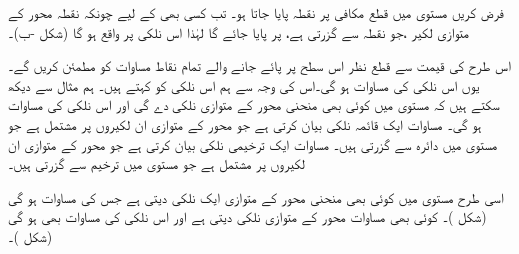 فرض کریں مستوی  میں  قطع مکافی  پر نقطہ  پایا جاتا ہو۔ تب کسی بھی  کے لیے  چونکہ نقطہ  محور  کے متوازی  لکیر  ،جو نقطہ  سے گزرتی ہے،    پر پایا جائے گا  لہٰذا   اس نلکی پر  واقع ہو  گا (شکل -ب)۔

اس طرح   کی قیمت سے قطع نظر  اس سطح پر پائے جانے والے  تمام نقاط  مساوات  کو مطمئن کریں گے۔ یوں  اس نلکی  کی مساوات ہو گی۔اس کی وجہ سے ہم اس نلکی کو  کہتے ہیں۔
ہم مثال  سے دیکھ سکتے ہیں کہ مستوی   میں کوئی بھی منحنی   محور  کے متوازی نلکی   دے گی  اور اس نلکی کی  مساوات   ہو گی۔ مساوات  ایک قائمہ نلکی بیان کرتی ہے جو  محور  کے متوازی  ان  لکیروں پر مشتمل ہے جو مستوی  میں دائرہ  سے گزرتی  ہیں۔   مساوات  ایک ترخیمی  نلکی بیان کرتی ہے جو  محور  کے متوازی  ان  لکیروں پر مشتمل ہے جو مستوی  میں ترخیم  سے گزرتی ہیں۔ 

اسی طرح مستوی  میں کوئی بھی منحنی  محور  کے متوازی ایک نلکی دیتی ہے جس کی مساوات  ہو گی (شکل )۔ کوئی بھی مساوات   محور  کے متوازی نلکی دیتی ہے اور اس نلکی کی  مساوات بھی   ہو گی  (شکل )۔

